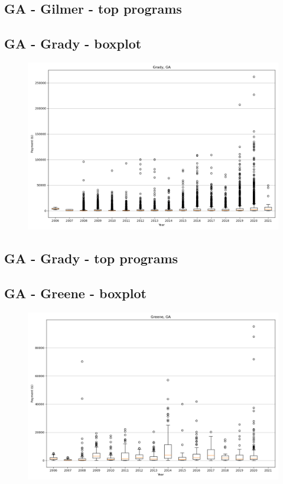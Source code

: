\subsection*{GA - Gilmer - top programs}

\newpage
\subsection*{GA - Grady - boxplot}
\begin{figure}[h]
\centering
\includegraphics[width=7in]{../output/boxplots/counties/Grady-GA_boxplot.png}
\end{figure}


\subsection*{GA - Grady - top programs}

\newpage
\subsection*{GA - Greene - boxplot}
\begin{figure}[h]
\centering
\includegraphics[width=7in]{../output/boxplots/counties/Greene-GA_boxplot.png}
\end{figure}


